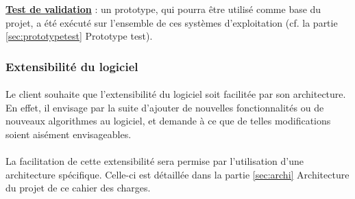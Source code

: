 \textbf{\underline{Test de validation}} : un prototype, qui pourra être utilisé comme base du projet, a été exécuté sur l’ensemble de ces systèmes d’exploitation (cf.  la partie \ref{sec:prototypetest} Prototype test).

\subsubsection{Extensibilité du logiciel}
\paragraph{}
	Le client souhaite que l’extensibilité du logiciel soit facilitée par son architecture. En effet, il envisage par la suite d’ajouter de nouvelles fonctionnalités ou de nouveaux algorithmes au logiciel, et demande à ce que de telles modifications soient aisément envisageables.
\paragraph{}
	La facilitation de cette extensibilité sera permise par l’utilisation d’une architecture spécifique. Celle-ci est détaillée dans la partie \ref{sec:archi} Architecture du projet de ce cahier des charges.   
